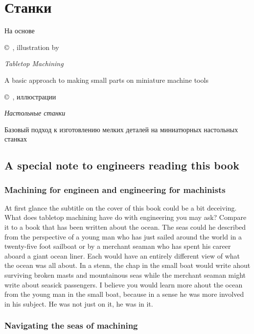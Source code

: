 \part{Станки}\label{stanki}

На основе 

\copyright\ , illustration by 

\emph{Tabletop Machining}

A basic approach to making small parts on miniature machine tools

\bigskip

\copyright\ , иллюстрации  

\emph{Настольные станки}

Базовый подход к изготовлению мелких деталей на миниатюрных настольных станках

\clearpage
\chapter{A special note to engineers reading this book}

\section{Machining for engineen and engineering for machinists}

At first glance the subtitle on the cover of this book
could be a bit deceiving. What does tabletop
machining have do with engineering you may ask?
Compare it to a book that has been written about
the ocean. The seas could he described from the
perspective of a young man who has just sailed
around the world in a twenty-five foot sailboat or
by a merchant seaman who has spent his career
aboard a giant ocean liner. Each would have an
entirely different view of what the ocean was all
about. In a stenn, the chap in the small boat would
write ahout surviving broken masts and
mountainous seas while the merchant seaman might
write about seasick passengers. I believe you would
learn more ahout the ocean from the young man in
the small boat, because in a sense he was more
involved in his subject. He was not just on it, he
was in it.

\section{Navigating the seas of machining}

